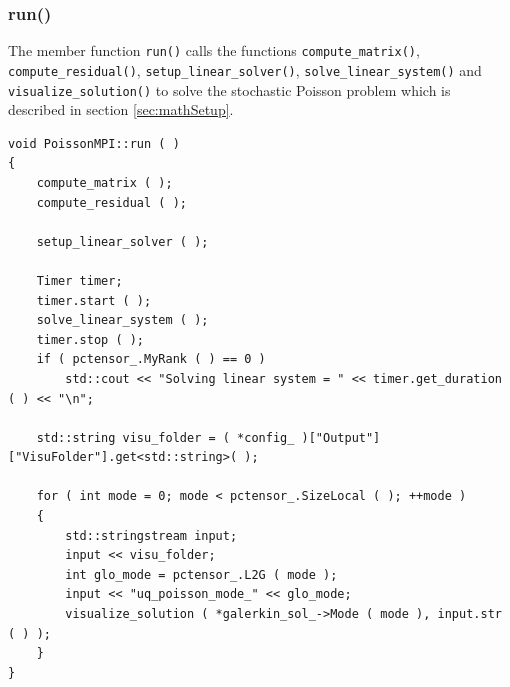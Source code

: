 \documentclass{article}
\begin{document}
\subsubsection{run()}
\label{sec:program:subsec:run}


The member function \texttt{run()} calls the functions \texttt{compute\_matrix()},  \texttt{compute\_residual()}, \texttt{setup\_linear\_solver()}, \texttt{solve\_linear\_system()} and \texttt{visualize\_solution()} to solve the stochastic Poisson problem which is described in section \ref{sec:mathSetup}. 


\begin{lstlisting}[firstnumber=39]
void PoissonMPI::run ( )
{
    compute_matrix ( );
    compute_residual ( );

    setup_linear_solver ( );

    Timer timer;
    timer.start ( );
    solve_linear_system ( );
    timer.stop ( );
    if ( pctensor_.MyRank ( ) == 0 )
        std::cout << "Solving linear system = " << timer.get_duration ( ) << "\n";

    std::string visu_folder = ( *config_ )["Output"]["VisuFolder"].get<std::string>( );

    for ( int mode = 0; mode < pctensor_.SizeLocal ( ); ++mode )
    {
        std::stringstream input;
        input << visu_folder;
        int glo_mode = pctensor_.L2G ( mode );
        input << "uq_poisson_mode_" << glo_mode;
        visualize_solution ( *galerkin_sol_->Mode ( mode ), input.str ( ) );
    }
}
\end{lstlisting}
\end{document}
